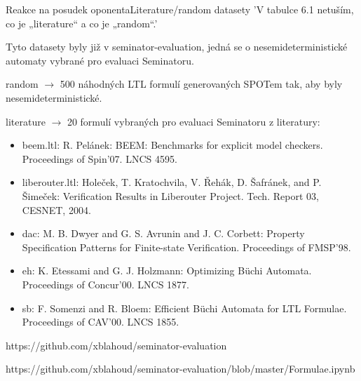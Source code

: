 \documentclass[
]{beamer}
\begin{document}
	\begin{frame}{Reakce na posudek oponenta}{Literature/random datasety}
		'V tabulce 6.1 netuším, co je „literature“ a co je „random“.'
		
		Tyto datasety byly již v seminator-evaluation, jedná se o nesemideterministické automaty vybrané pro evaluaci Seminatoru.
		
		random $\rightarrow$ 500 náhodných LTL formulí generovaných SPOTem tak, aby byly nesemideterministické.
		
		literature $\rightarrow$ 20 formulí vybraných pro evaluaci Seminatoru z literatury: 
		\begin{itemize}
			
			
			\item beem.ltl: R. Pelánek: BEEM: Benchmarks for explicit model checkers. Proceedings of Spin'07. LNCS 4595.
			\item liberouter.ltl: Holeček, T. Kratochvila, V. Řehák, D. Šafránek, and P. Šimeček: Verification Results in Liberouter Project. Tech. Report 03, CESNET, 2004.
			\item dac: M. B. Dwyer and G. S. Avrunin and J. C. Corbett: Property Specification Patterns for Finite-state Verification. Proceedings of FMSP'98.
			\item eh: K. Etessami and G. J. Holzmann: Optimizing Büchi Automata. Proceedings of Concur'00. LNCS 1877.
			\item sb: F. Somenzi and R. Bloem: Efficient Büchi Automata for LTL Formulae. Proceedings of CAV'00. LNCS 1855.
			
			
		\end{itemize}
		
		{https://github.com/xblahoud/seminator-evaluation}
		
		{https://github.com/xblahoud/seminator-evaluation/blob/master/Formulae.ipynb}
		
	\end{frame}
	
	
\end{document}
